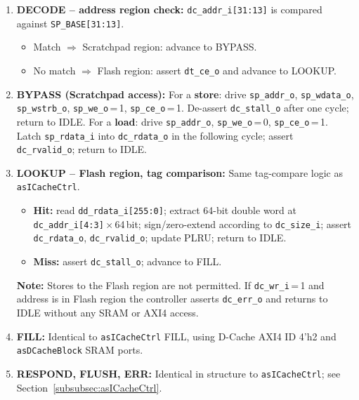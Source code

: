 \begin{enumerate}
  \item \textbf{DECODE -- address region check:}
    \texttt{dc\_addr\_i[31:13]} is compared against
    \texttt{SP\_BASE[31:13]}.
    \begin{itemize}
      \item Match $\Rightarrow$ Scratchpad region: advance to BYPASS.
      \item No match $\Rightarrow$ Flash region: assert \texttt{dt\_ce\_o}
        and advance to LOOKUP.
    \end{itemize}

  \item \textbf{BYPASS (Scratchpad access):}
    For a \textbf{store}: drive \texttt{sp\_addr\_o},
    \texttt{sp\_wdata\_o}, \texttt{sp\_wstrb\_o},
    \texttt{sp\_we\_o}\,=\,1, \texttt{sp\_ce\_o}\,=\,1.
    De-assert \texttt{dc\_stall\_o} after one cycle; return to IDLE.
    For a \textbf{load}: drive \texttt{sp\_addr\_o},
    \texttt{sp\_we\_o}\,=\,0, \texttt{sp\_ce\_o}\,=\,1.
    Latch \texttt{sp\_rdata\_i} into \texttt{dc\_rdata\_o} in the
    following cycle; assert \texttt{dc\_rvalid\_o}; return to IDLE.

  \item \textbf{LOOKUP -- Flash region, tag comparison:}
    Same tag-compare logic as \texttt{asICacheCtrl}.
    \begin{itemize}
      \item \textbf{Hit:} read \texttt{dd\_rdata\_i[255:0]};
        extract 64-bit double word at
        \texttt{dc\_addr\_i[4:3]}\,$\times$\,64\,bit;
        sign/zero-extend according to \texttt{dc\_size\_i};
        assert \texttt{dc\_rdata\_o}, \texttt{dc\_rvalid\_o};
        update PLRU; return to IDLE.
      \item \textbf{Miss:} assert \texttt{dc\_stall\_o}; advance to FILL.
    \end{itemize}
    \textbf{Note:} Stores to the Flash region are not permitted.
    If \texttt{dc\_wr\_i}\,=\,1 and address is in Flash region the
    controller asserts \texttt{dc\_err\_o} and returns to IDLE without
    any SRAM or AXI4 access.

  \item \textbf{FILL:}
    Identical to \texttt{asICacheCtrl} FILL, using D-Cache AXI4 ID
    4'h2 and \texttt{asDCacheBlock} SRAM ports.

  \item \textbf{RESPOND, FLUSH, ERR:}
    Identical in structure to \texttt{asICacheCtrl}; see
    Section~\ref{subsubsec:asICacheCtrl}.
\end{enumerate}

